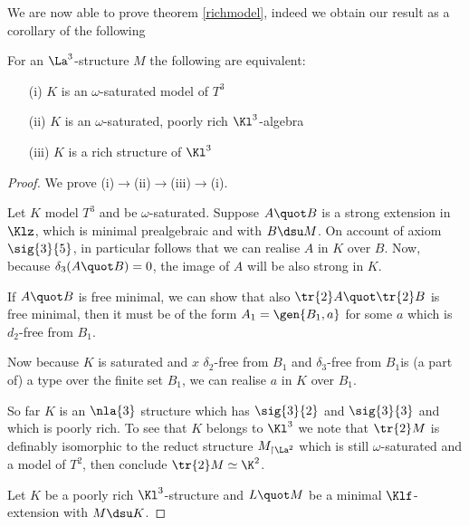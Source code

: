 We are now able to prove theorem \ref{richmodel}, indeed we obtain our result as a corollary of
the following
\begin{prop}
For an $\La^{3}$-structure $M$ the following are equivalent:
\begin{itemize}
\item[{\rm(i)}]$K$ is an $\omega$-saturated model of $T^{3}$
\item[{\rm(ii)}]$K$ is an $\omega$-saturated, poorly rich $\Kl^{3}$-algebra
\item[{\rm(iii)}]$K$ is a rich structure of $\Kl^{3}$
\end{itemize}
\end{prop}
\begin{proof}
We prove (i)$\rightarrow$(ii)$\rightarrow$(iii)$\rightarrow$(i).

Let $K$ model $T^{3}$ and be $\omega$-saturated. Suppose $A\quot B$ is 
a strong extension in $\Klz$, which is minimal prealgebraic and with $B\dsu M$.
On account of axiom $\sig{3}{5}$, in particular follows that we can realise $A$ in $K$ over $B$.
Now, because $\delta_{3}(A\quot B)=0$, the image of $A$ will be also strong in $K$.

If $A\quot B$ is free minimal, we can show that
also $\tr{2}A\quot\tr{2}B$ is free minimal, then it must be of the form $A_{1}=\gen{B_{1},a}$ for some
$a$ which is $d_{2}$-free from $B_{1}$.

Now because $K$ is saturated and \lqq$x$ $\delta_{2}$-free from $B_{1}$ and $\delta_{3}$-free from
$B_{1}$\rqq  is (a part of) a type over the finite set $B_{1}$, we can realise $a$ in $K$ over $B_{1}$.

So far $K$ is an $\nla{3}$ structure which has $\sig{3}{2}$ and $\sig{3}{3}$ and which
is poorly rich. To see that $K$ belongs to $\Kl^{3}$ we note that $\tr{2}M$ is 
definably isomorphic to the reduct structure $M_{\upharpoonright\La^{2}}$ which is
still $\omega$-saturated and a model of $T^{2}$, then conclude $\tr{2}M\simeq\K^{2}$.

\medskip  
Let $K$ be a poorly rich $\Kl^{3}$-structure and $L\quot M$ be a minimal $\Klf$-extension with $M\dsu K$.


\end{proof}
